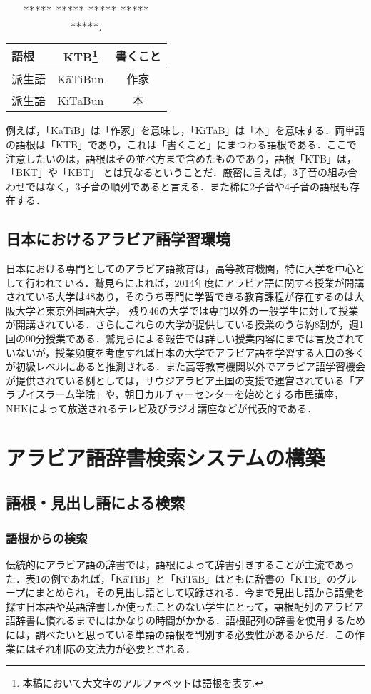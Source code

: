 \documentclass[technicalreport]{ieicej}
\begin{document}
\begin{table}[ht]
\begin{center}
\begin{tabular}{l|cc}
   語根& KTB\footnote{本稿において大文字のアルファベットは語根を表す.} & 書くこと\\
  \hline
 派生語& KāTiBun & 作家\\
  派生語& KiTāBun & 本\\
\hline
\end{tabular}
\caption{***** ***** ***** ***** *****.}
\label{table:alignment}
\end{center}
\end{table}

例えば，「KāTiB」は「作家」を意味し，「KiTāB」は「本」を意味する．両単語の語根は「KTB」であり，これは「書くこと」にまつわる語根である．ここで注意したいのは，語根はその並べ方まで含めたものであり，語根「KTB」は，「BKT」や「KBT」 とは異なるということだ．厳密に言えば，3子音の組み合わせではなく，3子音の順列であると言える．また稀に2子音や4子音の語根も存在する．

\subsection{日本におけるアラビア語学習環境}
日本における専門としてのアラビア語教育は，高等教育機関，特に大学を中心として行われている．鷲見らによれば，2014年度にアラビア語に関する授業が開講されている大学は48あり，そのうち専門に学習できる教育課程が存在するのは大阪大学と東京外国語大学， 残り46の大学では専門以外の一般学生に対して授業が開講されている．さらにこれらの大学が提供している授業のうち約8割が，週1回の90分授業である．鷲見らによる報告では詳しい授業内容にまでは言及されていないが，授業頻度を考慮すれば日本の大学でアラビア語を学習する人口の多くが初級レベルにあると推測される．また高等教育機関以外でアラビア語学習機会が提供されている例としては，サウジアラビア王国の支援で運営されている「アラブイスラーム学院」や，朝日カルチャーセンターを始めとする市民講座，NHKによって放送されるテレビ及びラジオ講座などが代表的である．

\section{アラビア語辞書検索システムの構築}
\subsection{語根・見出し語による検索}
\subsubsection{語根からの検索}
伝統的にアラビア語の辞書では，語根によって辞書引きすることが主流であった．表1の例であれば，「KāTiB」と「KiTāB」はともに辞書の「KTB」のグループにまとめられ，その見出し語として収録される．今まで見出し語から語彙を探す日本語や英語辞書しか使ったことのない学生にとって，語根配列のアラビア語辞書に慣れるまでにはかなりの時間がかかる．語根配列の辞書を使用するためには，調べたいと思っている単語の語根を判別する必要性があるからだ．この作業にはそれ相応の文法力が必要とされる．
\end{document}
